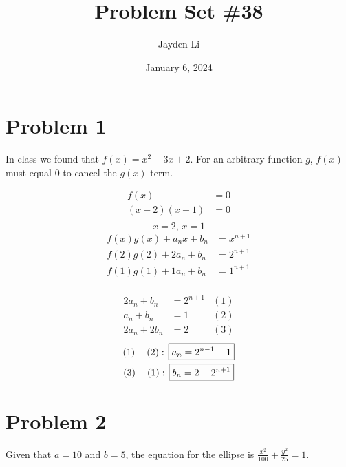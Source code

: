 \documentclass{article}
\title{Problem Set \#38}
\author{Jayden Li}
\date{January 6, 2024}
\begin{document}
\maketitle

\section*{Problem 1}
In class we found that $f(x)=x^2-3x+2$. For an arbitrary function
$g$, $f(x)$ must equal $0$ to cancel the $g(x)$ term.
\centering
\begin{minipage}[t]{0.3\linewidth}
\[
\begin{aligned}
	f(x)&=0 \\
	(x-2)(x-1)&=0 \\
\end{aligned}
\]
\begin{equation*}
	x=2,\,x=1
\end{equation*}
\begin{align*}
	f(x)g(x)+a_nx+b_n&=x^{n+1} \\
	f(2)g(2)+2a_n+b_n&=2^{n+1} \\
	f(1)g(1)+1a_n+b_n&=1^{n+1} \\
\end{align*}
\end{minipage}
\begin{minipage}[t]{0.3\linewidth}
\[
\begin{aligned}
	2a_n+b_n&=2^{n+1}&(1) \\
	a_n+b_n&=1&(2) \\
	2a_n+2b_n&=2&(3)
\end{aligned}
\]
\begin{gather*}
	(1)-(2):\,
	\setlength{\abovedisplayskip}{3pt}
	\boxed{a_n=2^{n-1}-1} \\
	(3)-(1):\,
	\boxed{b_n=2-2^{n+1}}
\end{gather*}
\end{minipage}
\flushleft

\section*{Problem 2}
Given that $a=10$ and $b=5$, the equation for the ellipse is
$\displaystyle{\frac{x^2}{100}+\frac{y^2}{25}=1}$.
\end{document}
